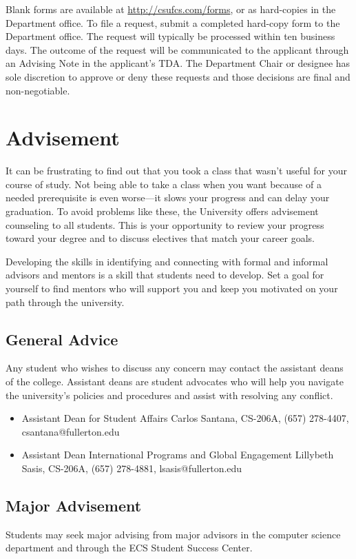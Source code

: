 \documentclass{book}
\newcommand{\shrunkurl}[1]{\url{http://csufcs.com/#1}}
\begin{document}
Blank forms are available at \shrunkurl{forms}, or as hard-copies in
the Department office. To file a request, submit a completed hard-copy
form to the Department office. The request will typically be processed
within ten business days. The outcome of the request will be
communicated to the applicant through an Advising Note in the
applicant’s TDA. The Department Chair or designee has sole discretion
to approve or deny these requests and those decisions are final and
non-negotiable.

\chapter{Advisement}

It can be frustrating to find out that you took a class that wasn't
useful for your course of study. Not being able to take a class when
you want because of a needed prerequisite is even worse---it slows
your progress and can delay your graduation. To avoid problems like
these, the University offers advisement counseling to all
students. This is your opportunity to review your progress toward your
degree and to discuss electives that match your career goals.

Developing the skills in identifying and connecting with formal and
informal advisors and mentors is a skill that students need to
develop. Set a goal for yourself to find mentors who will support you
and keep you motivated on your path through the university.

\section{General Advice}
 Any student who wishes to discuss any
concern may contact the assistant deans of the college. Assistant
deans are student advocates who will help you navigate the
university’s policies and procedures and assist with resolving any
conflict.
\begin{itemize}
\item Assistant Dean for Student Affairs Carlos Santana, CS-206A,
  (657) 278-4407, csantana@fullerton.edu
\item Assistant Dean International Programs and Global Engagement
  Lillybeth Sasis, CS-206A, (657) 278-4881, lsasis@fullerton.edu
\end{itemize} 

\section{Major Advisement}
 Students may seek major advising from major
advisors in the computer science department and through the ECS
Student Success Center.
\end{document}
